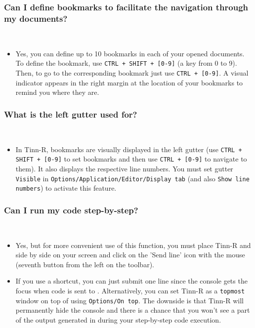 \subsubsection{Can I define bookmarks to facilitate the navigation through my documents?}\\

\begin{itemize}
  \item Yes, you can define up to 10 bookmarks in each of your opened documents.
    To define the bookmark, use \texttt{CTRL + SHIFT + [0-9]} (a key from 0 to 9).
    Then, to go to the corresponding bookmark just use \texttt{CTRL + [0-9]}.
    A visual indicator appears in the right margin at the location of your
    bookmarks to remind you where they are.
\end{itemize}


\subsubsection{What is the left gutter used for?}\\

\begin{itemize}
  \item In Tinn-R, bookmarks are visually displayed in the left gutter
    (use \texttt{CTRL + SHIFT + [0-9]} to set bookmarks and then use
    \texttt{CTRL + [0-9]} to navigate to them). It also displays the
    respective line numbers. You must set gutter \texttt{Visible} in
    \texttt{Options/Application/Editor/Display tab} (and also
    \texttt{Show line numbers}) to activate this feature.
\end{itemize}


\subsubsection{Can I run my code step-by-step?}\\

\begin{itemize}
  \item Yes, but for more convenient use of this function, you must
    place Tinn-R and \RR{} side by side on your screen and click on the
    'Send line' icon with the mouse (seventh button from the left
    on the \RR{} toolbar).
  \item If you use a shortcut, you can just submit one line since the
    \RR{} console gets the focus when code is sent to \RR{}. Alternatively,
    you can set Tinn-R as a \texttt{topmost} window on top of \RR{}
    using \texttt{Options/On top}. The downside is that Tinn-R
    will permanently hide the \RR{} console and there is a chance
    that you won't see a part of the output generated in \RR{} during
    your step-by-step code execution.
\end{itemize}


